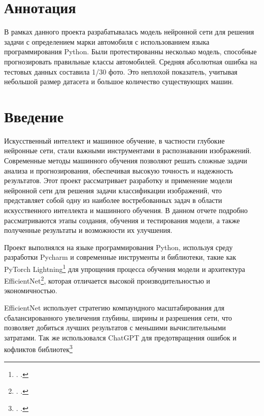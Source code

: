 \documentclass[14pt]{extarticle}
\begin{document}

\tableofcontents %

\section{Аннотация}

В рамках данного проекта разрабатывалась модель нейронной сети для решения задачи с определением марки автомобиля с использованием языка программирования Python. Были протестированны несколько  модель, способные прогнозировать правильные классы автомобилей. Средняя абсолютная ошибка на тестовых данных составила 1/30 фото. Это неплохой показатель, учитывая небольшой размер датасета и большое количество существующих машин. 

\section{Введение}
\setlength{\parindent}{1cm}  %
\hspace{1cm}Искусственный интеллект и машинное обучение, в частности глубокие нейронные сети, стали важными инструментами в распознавании изображений. Современные методы машинного обучения позволяют решать сложные задачи анализа и прогнозирования, обеспечивая высокую точность и надежность результатов. Этот проект рассматривает разработку и применение модели нейронной сети для решения задачи классификации изображений, что представляет собой одну из наиболее востребованных задач в области искусственного интеллекта и машинного обучения. В данном отчете подробно рассматриваются этапы создания, обучения и тестирования модели, а также полученные результаты и возможности их улучшения.

Проект выполнялся на языке программирования Python, используя среду разработки Pycharm и современные инструменты и библиотеки, такие как PyTorch Lightning\footnote{\citeauthor{youtubevideo}. \emph{}.} для упрощения процесса обучения модели и архитектура EfficientNet\footnote{\citeauthor{paperswithcode}. \emph{}.}, которая отличается высокой производительностью и экономичностью.

EfficientNet использует стратегию компаундного масштабирования для сбалансированного увеличения глубины, ширины и разрешения сети, что позволяет добиться лучших результатов с меньшими вычислительными затратами.
Так же использовался ChatGPT для предотвращения ошибок и кофликтов библиотек\footnote{\citeauthor{chatgpt}. \emph{}.}
\end{document}

